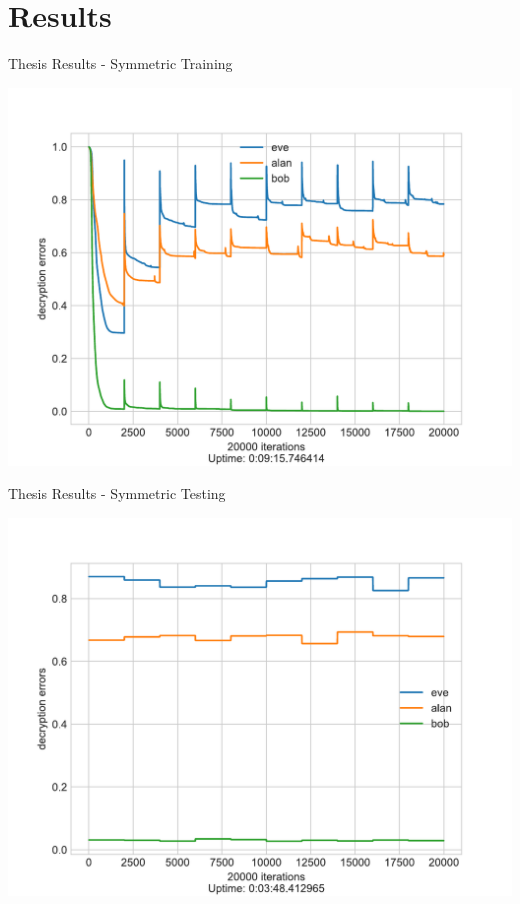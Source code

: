 \documentclass{beamer}
\begin{document}
		\section{Results}
		\begin{frame}{Thesis Results - Symmetric Training}
			\begin{center}
				\includegraphics[height=0.9\textheight]{neurencoder-symmetric-training}
			\end{center}
		\end{frame}
		\begin{frame}{Thesis Results - Symmetric Testing}
			\begin{center}
				\includegraphics[height=0.9\textheight]{neurencoder-symmetric-testing}
			\end{center}
		\end{frame}
\end{document}
